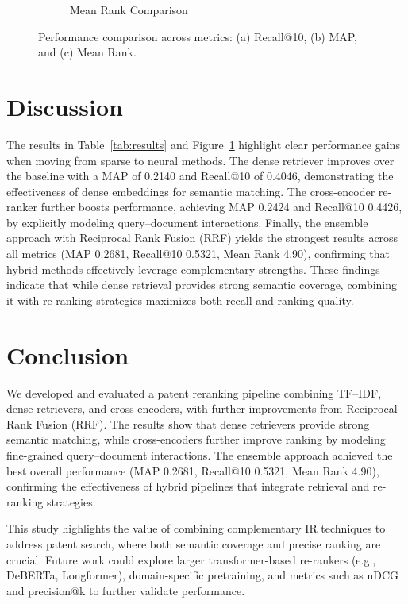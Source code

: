 \documentclass[11pt,a4paper]{article}
\begin{document}
\begin{figure}[H]
\begin{subfigure}{0.32\linewidth}
        \caption{Mean Rank Comparison}
    \end{subfigure}
    \caption{Performance comparison across metrics: (a) Recall@10, (b) MAP, and (c) Mean Rank.}
    \label{fig:perf-comparison}
\end{figure}

\section{Discussion}
The results in Table~\ref{tab:results} and Figure~\ref{fig:perf-comparison} highlight clear performance gains when moving from sparse to neural methods. 
The dense retriever improves over the baseline with a MAP of 0.2140 and Recall@10 of 0.4046, demonstrating the effectiveness of dense embeddings for semantic matching. 
The cross-encoder re-ranker further boosts performance, achieving MAP 0.2424 and Recall@10 0.4426, by explicitly modeling query--document interactions. 
Finally, the ensemble approach with Reciprocal Rank Fusion (RRF) yields the strongest results across all metrics (MAP 0.2681, Recall@10 0.5321, Mean Rank 4.90), confirming that hybrid methods effectively leverage complementary strengths. 
These findings indicate that while dense retrieval provides strong semantic coverage, combining it with re-ranking strategies maximizes both recall and ranking quality.
 
\section{Conclusion}
We developed and evaluated a patent reranking pipeline combining TF--IDF, dense retrievers, and cross-encoders, with further improvements from Reciprocal Rank Fusion (RRF). 
The results show that dense retrievers provide strong semantic matching, while cross-encoders further improve ranking by modeling fine-grained query--document interactions. 
The ensemble approach achieved the best overall performance (MAP 0.2681, Recall@10 0.5321, Mean Rank 4.90), confirming the effectiveness of hybrid pipelines that integrate retrieval and re-ranking strategies. 

This study highlights the value of combining complementary IR techniques to address patent search, where both semantic coverage and precise ranking are crucial. 
Future work could explore larger transformer-based re-rankers (e.g., DeBERTa, Longformer), domain-specific pretraining, and metrics such as nDCG and precision@k to further validate performance.



\end{document}
